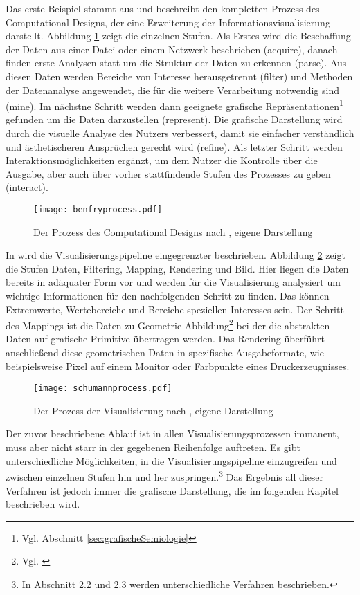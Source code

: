 \documentclass[a4paper, 12pt, DIVcalc, onepage, pdftex, headsepline, footsepline]{scrreprt}
\begin{document}
Das erste Beispiel stammt aus \citep{BenFry} und beschreibt den kompletten Prozess des Computational Designs,
der eine Erweiterung der Informationsvisualisierung darstellt. Abbildung \ref{fig:benfryprocess} zeigt
die einzelnen Stufen. Als Erstes wird die Beschaffung der Daten aus einer Datei oder einem Netzwerk
beschrieben (acquire), danach finden erste Analysen statt um die Struktur der Daten zu erkennen (parse).
Aus diesen Daten werden Bereiche von Interesse herausgetrennt (filter) und Methoden der Datenanalyse angewendet,
die für die weitere Verarbeitung notwendig sind (mine). Im nächstne Schritt werden dann geeignete
grafische Repräsentationen\footnote{Vgl. Abschnitt \ref{sec:grafischeSemiologie}} gefunden um die Daten
darzustellen (represent). Die grafische Darstellung wird durch die visuelle Analyse des Nutzers
verbessert, damit sie einfacher verständlich und ästhetischeren Ansprüchen gerecht wird (refine). Als letzter
Schritt werden Interaktionsmöglichkeiten ergänzt, um dem Nutzer die Kontrolle über die
Ausgabe, aber auch über vorher stattfindende Stufen des Prozesses zu geben (interact).
\begin{figure}
\centering
\texttt{[image: benfryprocess.pdf]}
\caption{Der Prozess des Computational Designs nach \citep[S.\,13]{BenFry}, eigene Darstellung}
\label{fig:benfryprocess}
\end{figure}

In \citep{Schumann} wird die Visualisierungspipeline eingegrenzter beschrieben. Abbildung
\ref{fig:schumannprocess} zeigt die Stufen Daten, Filtering, Mapping, Rendering und Bild.
Hier liegen die Daten bereits in adäquater Form vor und werden für die Visualisierung
analysiert um wichtige Informationen für den nachfolgenden Schritt zu finden. Das können
Extremwerte, Wertebereiche und Bereiche speziellen Interesses sein. Der Schritt des Mappings
ist die Daten-zu-Geometrie-Abbildung\footnote{Vgl. \citep[S.\,16]{Schumann}} bei der
die abstrakten Daten auf grafische Primitive übertragen werden. Das Rendering überführt
anschließend diese geometrischen Daten in spezifische Ausgabeformate, wie beispielsweise Pixel auf
einem Monitor oder Farbpunkte eines Druckerzeugnisses.
\begin{figure}
\centering
\texttt{[image: schumannprocess.pdf]}
\caption{Der Prozess der Visualisierung nach \citep[S.\,15]{Schumann}, eigene Darstellung}
\label{fig:schumannprocess}
\end{figure}

Der zuvor beschriebene Ablauf ist in allen Visualisierungsprozessen immanent, muss aber nicht starr
in der gegebenen Reihenfolge auftreten. Es gibt unterschiedliche Möglichkeiten, in die
Visualisierungspipeline einzugreifen und zwischen einzelnen Stufen hin und her
zuspringen.\footnote{In \citep{Schumann} Abschnitt 2.2 und 2.3 werden
unterschiedliche Verfahren beschrieben.}
Das Ergebnis all dieser Verfahren ist jedoch immer die grafische Darstellung, die im
folgenden Kapitel beschrieben wird.
\end{document}
